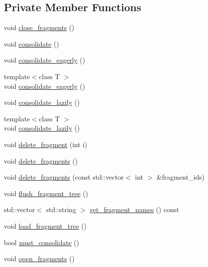\subsection*{Private Member Functions}
\begin{DoxyCompactItemize}
\item 
void \hyperlink{classArray_aa23c312df57bc1193601c843d3a544ff}{close\+\_\+fragments} ()
\item 
void \hyperlink{classArray_a3818997eca2880200e528ffff8bd9950}{consolidate} ()
\item 
void \hyperlink{classArray_ab44394c7d64bd198e3b0df4db979dcd6}{consolidate\+\_\+eagerly} ()
\item 
{\footnotesize template$<$class T $>$ }\\void \hyperlink{classArray_a58487e1a68483d86263258f9b71803da}{consolidate\+\_\+eagerly} ()
\item 
void \hyperlink{classArray_a9c908d3c674c9f3a0e7ae7dd03acb279}{consolidate\+\_\+lazily} ()
\item 
{\footnotesize template$<$class T $>$ }\\void \hyperlink{classArray_a567e0498c7aa5a146c8a29af645d136b}{consolidate\+\_\+lazily} ()
\item 
void \hyperlink{classArray_ac8525ebc76136214f92edafc777c12b1}{delete\+\_\+fragment} (int i)
\item 
void \hyperlink{classArray_a6ee6603c3a220d0a420443043afe9348}{delete\+\_\+fragments} ()
\item 
void \hyperlink{classArray_ad7104c8e939f77fbe2e603f4bdfc174f}{delete\+\_\+fragments} (const std\+::vector$<$ int $>$ \&fragment\+\_\+ids)
\item 
void \hyperlink{classArray_a6cecb7cb06afc906103e696d70b817a3}{flush\+\_\+fragment\+\_\+tree} ()
\item 
std\+::vector$<$ std\+::string $>$ \hyperlink{classArray_a3a598eb1d97ed5a8d3a11dce1e45ecb8}{get\+\_\+fragment\+\_\+names} () const 
\item 
void \hyperlink{classArray_ac83af00b3fcd959942634807c01ac0b1}{load\+\_\+fragment\+\_\+tree} ()
\item 
bool \hyperlink{classArray_ac52f44f19f384efc2947b9ebcc4a3fa4}{must\+\_\+consolidate} ()
\item 
void \hyperlink{classArray_ae3501ad346d81cac350316e1b39decee}{open\+\_\+fragments} ()
\end{DoxyCompactItemize}
